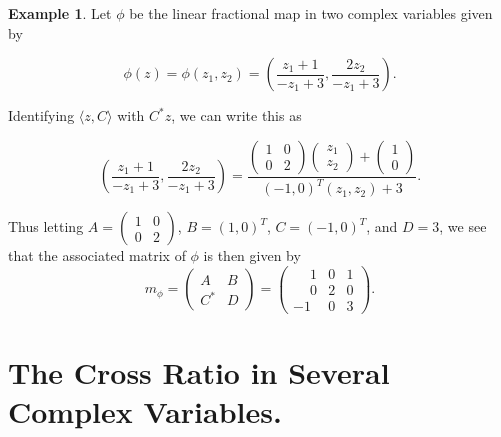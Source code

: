 \documentclass{amsart}
\theoremstyle{theorem}
\theoremstyle{lemma}
\theoremstyle{definition}
\newtheorem*{example}{Example}
\begin{document}
\begin{example}
Let $\phi$ be the linear fractional map in two complex variables given by

$$\phi(z)=\phi(z_1,z_2)=\left( \frac{z_1+1}{-z_1+3}, \frac{2z_2}{-z_1+3} \right).$$

Identifying $\langle z, C \rangle$ with $C^*z$, we can write this as 

$$\left( \frac{z_1+1}{-z_1+3}, \frac{2z_2}{-z_1+3} \right)=\frac{\begin{pmatrix}
       1 & 0  \\
       0 & 2 
     \end{pmatrix}\begin{pmatrix}
       z_1 \\
       z_2 
     \end{pmatrix}
+\begin{pmatrix}
       1 \\
       0 
     \end{pmatrix}}{(-1, 0)^T(z_1, z_2)+3}.$$

Thus letting $A=\begin{pmatrix}
       1 & 0  \\
       0 & 2 
     \end{pmatrix}$, $B=(1, 0)^T$, $C=(-1, 0)^T$, and $D=3$, we see that the associated matrix of $\phi$ is then given by
\begin{equation*}
    m_{\phi} = \begin{pmatrix}
        A & B \\
        C^* & D
     \end{pmatrix}=
 \begin{pmatrix}
        \phantom{-}1 & 0 & 1 \\
       \phantom{-} 0 & 2 & 0 \\
       -1 & 0 & 3
     \end{pmatrix}.
\end{equation*}

\end{example}

\section{The Cross Ratio in Several Complex Variables.}
\end{document}
